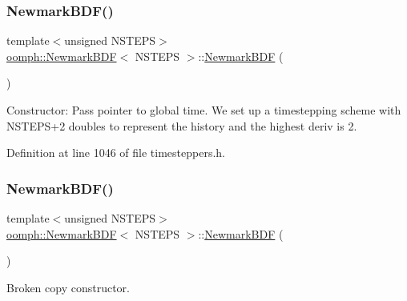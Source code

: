 \subsubsection{\texorpdfstring{Newmark\+B\+D\+F()}{NewmarkBDF()}\hspace{0.1cm}{\footnotesize\ttfamily [1/2]}}
{\footnotesize\ttfamily template$<$unsigned N\+S\+T\+E\+PS$>$ \\
\hyperlink{classoomph_1_1NewmarkBDF}{oomph\+::\+Newmark\+B\+DF}$<$ N\+S\+T\+E\+PS $>$\+::\hyperlink{classoomph_1_1NewmarkBDF}{Newmark\+B\+DF} (\begin{DoxyParamCaption}{ }\end{DoxyParamCaption})\hspace{0.3cm}{\ttfamily [inline]}}



Constructor\+: Pass pointer to global time. We set up a timestepping scheme with N\+S\+T\+E\+P\+S+2 doubles to represent the history and the highest deriv is 2. 



Definition at line 1046 of file timesteppers.\+h.

\mbox{\label{classoomph_1_1NewmarkBDF_aaefae5c777535c3cbd8daab7549a54e5}} 
\subsubsection{\texorpdfstring{Newmark\+B\+D\+F()}{NewmarkBDF()}\hspace{0.1cm}{\footnotesize\ttfamily [2/2]}}
{\footnotesize\ttfamily template$<$unsigned N\+S\+T\+E\+PS$>$ \\
\hyperlink{classoomph_1_1NewmarkBDF}{oomph\+::\+Newmark\+B\+DF}$<$ N\+S\+T\+E\+PS $>$\+::\hyperlink{classoomph_1_1NewmarkBDF}{Newmark\+B\+DF} (\begin{DoxyParamCaption}\item[{const \hyperlink{classoomph_1_1NewmarkBDF}{Newmark\+B\+DF}$<$ N\+S\+T\+E\+PS $>$ \&}]{ }\end{DoxyParamCaption})\hspace{0.3cm}{\ttfamily [inline]}}



Broken copy constructor. 



